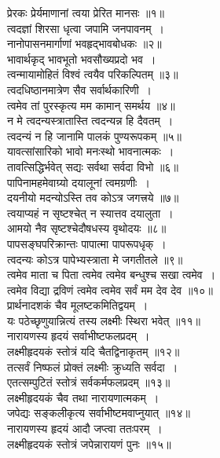 \documentclass[twoside,top=1.7cm, bottom=1.7cm, outer=1cm,landscape, inner=1.5cm,a5paper,]{book}
\begin{document}
\begin{center}
प्रेरकः प्रेर्यमाणानां त्वया प्रेरित मानसः ॥१॥\\[10pt]
त्वदज्ञां शिरसा धृत्वा जपामि जनपावनम्~।\\
नानोपासनमार्गाणां भवहृद्भावबोधकः ॥२॥\\[10pt]
भावार्थकृद् भावभूतो भवसौख्यप्रदो भव~।\\
त्वन्मायामोहितं विश्वं त्वयैव परिकल्पितम् ॥३॥\\[10pt]
त्वदधिष्ठानमात्रेण सैव सर्वार्थकारिणी~।\\
त्वमेव तां पुरस्कृत्य मम कामान् समर्थय ॥४॥\\[10pt]
न मे त्वदन्यस्त्रातास्ति त्वदन्यन्न हि दैवतम्~।\\
त्वदन्यं न हि जानामि पालकं पुण्यरूपकम् ॥५॥\\[10pt]
यावत्सांसारिको भावो मनःस्थो भावनात्मकः~।\\
तावत्सिद्धिर्भवेत् सद्यः सर्वथा सर्वदा विभो ॥६॥\\[10pt]
\newpage
पापिनामहमेवाग्र्यो दयालूनां त्वमग्रणीः~।\\
दयनीयो मदन्योऽस्ति तव कोऽत्र जगत्त्रये ॥७॥\\[10pt]
त्वयाप्यहं न सृष्टश्चेत् न स्यात्तव दयालुता~।\\
आमयो नैव सृष्टश्चेदौषधस्य वृथोदयः ॥८॥\\[10pt]
पापसङ्घपरिक्रान्तः पापात्मा पापरूपधृक्~।\\
त्वदन्यः कोऽत्र पापेभ्यस्त्राता मे जगतीतले ॥९॥\\[10pt]
त्वमेव माता च पिता त्वमेव त्वमेव बन्धुश्च सखा त्वमेव~।\\
त्वमेव विद्या द्रविणं त्वमेव त्वमेव सर्वं मम देव देव ॥१०॥\\[10pt]
\newpage
प्रार्थनादशकं चैव मूलष्टकमितिद्वयम्~।\\
यः पठेच्छृणुयान्नित्यं तस्य लक्ष्मीः स्थिरा भवेत् ॥११॥\\[10pt]
नारायणस्य हृदयं सर्वाभीष्टफलप्रदम्~।\\
लक्ष्मीहृदयकं स्तोत्रं यदि चैतद्विनाकृतम् ॥१२॥\\[10pt]
तत्सर्वं निष्फलं प्रोक्तं लक्ष्मीः क्रुध्यति सर्वदा~।\\
एतत्सम्पुटितं स्तोत्रं सर्वकर्मफलप्रदम् ॥१३॥\\[10pt]
लक्ष्मीहृदयकं चैव तथा नारायणात्मकम्~।\\
जपेद्यः सङ्कलीकृत्य सर्वाभीष्टमवाप्नुयात् ॥१४॥\\[10pt]
\newpage
नारायणस्य हृदयं आदौ जप्त्वा ततःपरम्~।\\
लक्ष्मीहृदयकं स्तोत्रं जपेन्नारायणं पुनः ॥१५॥\\[10pt]

\end{center}
\end{document}
